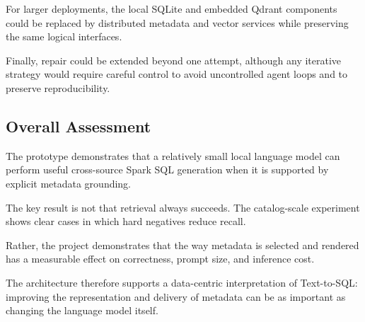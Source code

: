 For larger deployments, the local SQLite and embedded Qdrant components could
be replaced by distributed metadata and vector services while preserving the
same logical interfaces.

Finally, repair could be extended beyond one attempt, although any iterative
strategy would require careful control to avoid uncontrolled agent loops and
to preserve reproducibility.


\subsection{Overall Assessment}

The prototype demonstrates that a relatively small local language model can
perform useful cross-source Spark SQL generation when it is supported by
explicit metadata grounding.

The key result is not that retrieval always succeeds. The catalog-scale
experiment shows clear cases in which hard negatives reduce recall.

Rather, the project demonstrates that the way metadata is selected and
rendered has a measurable effect on correctness, prompt size, and inference
cost.

The architecture therefore supports a data-centric interpretation of
Text-to-SQL: improving the representation and delivery of metadata can be as
important as changing the language model itself.
